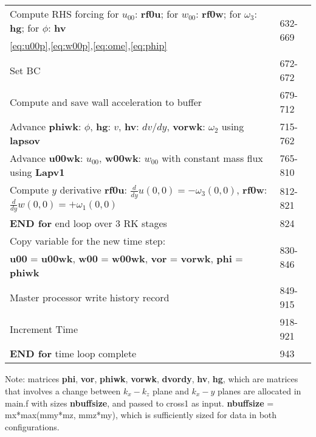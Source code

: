 \documentclass[titlepage,12pt,letter]{article}
\numberwithin{equation}{section}
\begin{document}
\begin{table}[H]
	\centering 
	\renewcommand{\arraystretch}{1.5} 
	\begin{tabular}{l|l}
		\qquad \qquad Compute RHS forcing for $u_{00}$: \textbf{rf0u}; for $w_{00}$: \textbf{rf0w}; for $\omega_3$: \textbf{hg}; for $\phi$: \textbf{hv}&\multirow{2}{*}{632-669}\\ 
		\qquad \qquad \eqref{eq:u00p},\eqref{eq:w00p},\eqref{eq:ome},\eqref{eq:phip}&\\
		\qquad \qquad Set BC&672-672\\
		\qquad \qquad Compute and save wall acceleration to buffer&679-712\\
		\qquad \qquad Advance \textbf{phiwk}: $\phi$, \textbf{hg}: $v$, \textbf{hv}: $dv/dy$, \textbf{vorwk}: $\omega_2$ using \textbf{lapsov}&715-762\\
		\qquad \qquad Advance \textbf{u00wk}: $u_{00}$, \textbf{w00wk}: $w_{00}$ with constant mass flux using \textbf{Lapv1}&765-810\\
		\qquad \qquad Compute $y$ derivative \textbf{rf0u}: ${\tfrac{d}{dy} u(0,0) = - \omega_3(0,0)}$, \textbf{rf0w}: ${\tfrac{d}{dy} w(0,0) = + \omega_1(0,0)}$&812-821\\
		\qquad \textbf{END for} end loop over 3 RK stages&824\\ \hdashline
		
		\qquad Copy variable for the new time step:& \multirow{2}{*}{830-846}\\
		\qquad \textbf{u00} = \textbf{u00wk}, \textbf{w00} = \textbf{w00wk}, \textbf{vor} = \textbf{vorwk}, \textbf{phi} = \textbf{phiwk}&\\
		\qquad Master processor write history record& 849-915\\
		\qquad Increment Time&918-921\\
		\textbf{END for} time loop complete&943\\ \hline
	\end{tabular} 
\end{table}


Note: matrices \textbf{phi}, \textbf{vor}, \textbf{phiwk}, \textbf{vorwk}, \textbf{dvordy}, \textbf{hv}, \textbf{hg}, which are matrices that involves a change between $k_x-k_z$ plane and $k_x-y$ planes are allocated in main.f with sizes \textbf{nbuffsize}, and passed to cross1 as input. \textbf{nbuffsize} = mx*max(mmy*mz, mmz*my), which is sufficiently sized for data in both configurations.
\end{document}
